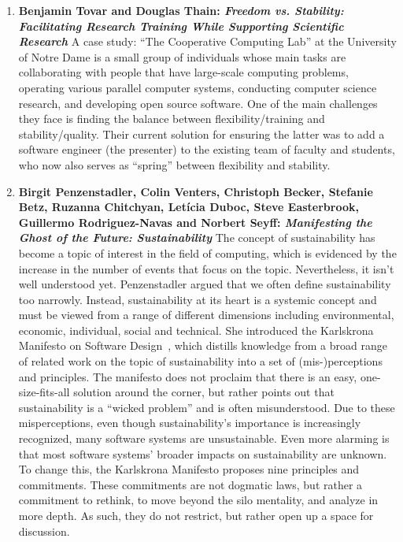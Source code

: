 \documentclass[11pt, oneside]{amsart}
\begin{document}
\begin{enumerate}
\item \textbf{Benjamin Tovar and Douglas Thain: \textit{Freedom vs. Stability:
Facilitating Research Training While Supporting Scientific Research}} A case
study: ``The Cooperative Computing Lab'' at the University of Notre Dame is a
small group of individuals whose main tasks are collaborating with people that
have large-scale computing problems, operating various parallel computer
systems, conducting computer science research, and developing open source
software. One of the main challenges they face is finding the balance between
flexibility/training and stability/quality. Their current solution for ensuring
the latter was to add a software engineer (the presenter) to the existing team
of faculty and students, who now also serves as ``spring'' between flexibility
and stability.

\item \textbf{Birgit Penzenstadler, Colin Venters, Christoph Becker, Stefanie
Betz, Ruzanna Chitchyan, Let\'{i}cia Duboc, Steve Easterbrook, Guillermo
Rodriguez-Navas and Norbert Seyff: \textit{Manifesting the Ghost of the Future:
Sustainability}} The concept of sustainability has become a topic of interest in
the field of computing, which is evidenced by the increase in the number of
events that focus on the topic. Nevertheless, it isn't well understood yet.
Penzenstadler argued that we often define sustainability too narrowly. Instead,
sustainability at its heart is a systemic concept and must be viewed from a
range of different dimensions including environmental, economic, individual,
social and technical. She introduced the Karlskrona Manifesto on Software
Design~\cite{Becker:2014}, which distills knowledge from a broad range of
related work on the topic of sustainability into a set of (mis-)perceptions and
principles. The manifesto does not proclaim that there is an easy,
one-size-fits-all solution around the corner, but rather points out that
sustainability is a ``wicked problem'' and is often misunderstood. Due to these
misperceptions, even though sustainability's importance is increasingly
recognized, many software systems are unsustainable. Even more alarming is that
most software systems' broader impacts on sustainability are unknown. To change
this, the Karlskrona Manifesto proposes nine principles and commitments. These
commitments are not dogmatic laws, but rather a commitment to rethink, to move
beyond the silo mentality, and analyze in more depth. As such, they do not
restrict, but rather open up a space for discussion.


\end{enumerate}
\end{document}
